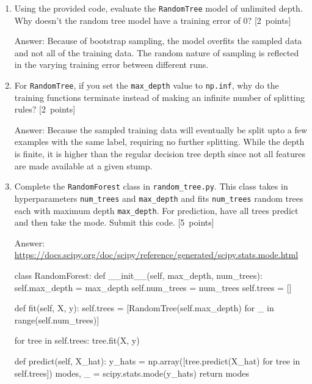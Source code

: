\documentclass{article}
\newcommand{\blu}[1]{{\textcolor{blu}{#1}}}
\newenvironment{answer}{\par\begingroup\color{gre}Answer: }{\endgroup}
\let\ask\blu
\newcommand\pts[1]{\textcolor{pointscolour}{[#1~points]}}
\begin{document}
    \begin{enumerate}
        \item Using the provided code, evaluate the \texttt{RandomTree} model of unlimited depth. \ask{Why doesn't the random tree model have a training error of 0?} \pts{2}
        \begin{answer}
            Because of bootstrap sampling, the model overfits the sampled data and not all of the training data. The random nature of sampling is reflected in the varying training error between different runs.
        \end{answer}

        \item For \texttt{RandomTree}, if you set the \texttt{max\_depth} value to \texttt{np.inf}, \ask{why do the training functions terminate instead of making an infinite number of splitting rules?} \pts{2}
        \begin{answer}
            Because the sampled training data will eventually be split upto a few examples with the same label, requiring no further splitting. While the depth is finite, it is higher than the regular decision tree depth since not all features are made available at a given stump.
        \end{answer}

        \item Complete the \texttt{RandomForest} class in \texttt{random\string_tree.py}. This class takes in hyperparameters \texttt{num\string_trees} and \texttt{max\string_depth} and
        fits \texttt{num\string_trees} random trees each with maximum depth \texttt{max\string_depth}. For prediction, have all trees predict and then take the mode. \ask{Submit this code.} \pts{5}
        \begin{answer}
            \url{https://docs.scipy.org/doc/scipy/reference/generated/scipy.stats.mode.html}
        \end{answer}
        \begin{python}
class RandomForest:
    def __init__(self, max_depth, num_trees):
        self.max_depth = max_depth
        self.num_trees = num_trees
        self.trees = []

    def fit(self, X, y):
        self.trees = [RandomTree(self.max_depth) for _ in range(self.num_trees)]

        for tree in self.trees:
            tree.fit(X, y)

    def predict(self, X_hat):
        y_hats = np.array([tree.predict(X_hat) for tree in self.trees])
        modes, _ = scipy.stats.mode(y_hats)
        return modes
        \end{python}


\end{enumerate}
\end{document}
